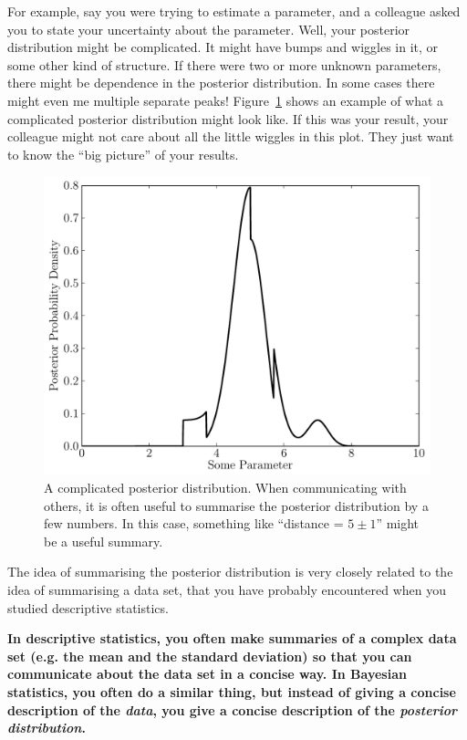 For example, say you were trying to estimate
a parameter, and a colleague asked you to state your uncertainty about the
parameter. Well, your posterior distribution might be complicated. It might
have bumps and wiggles in it, or some other kind of structure. If there were
two or more unknown parameters, there might be dependence in the posterior
distribution. In some cases there might even me multiple separate peaks!
Figure~\ref{fig:complicated_posterior} shows an example of what a complicated
posterior distribution might look like. If this was your result, your colleague
might not care about all the little wiggles in this plot. They just want to know
the ``big picture'' of your results.
\begin{figure}[h!]
\begin{center}
\includegraphics[scale=0.6]{Figures/complicated_posterior.pdf}
\caption{A complicated posterior distribution. When communicating with others,
it is often useful to summarise the posterior distribution by a few numbers. In
this case, something like ``distance = $5 \pm 1$'' might be a useful summary.
\label{fig:complicated_posterior}}
\end{center}
\end{figure}

The idea of summarising the posterior distribution is very closely related to
the idea of summarising a data set, that you have probably encountered when you
studied descriptive statistics.
\begin{framed}
{\bf In descriptive statistics, you often make summaries of a complex data set
(e.g. the mean and the standard deviation) so that you can communicate about
the data set in a concise way. In Bayesian statistics, you often do a similar
thing, but instead of giving a concise description of the {\it data}, you give a
concise description of the {\it posterior distribution}.}
\end{framed}

